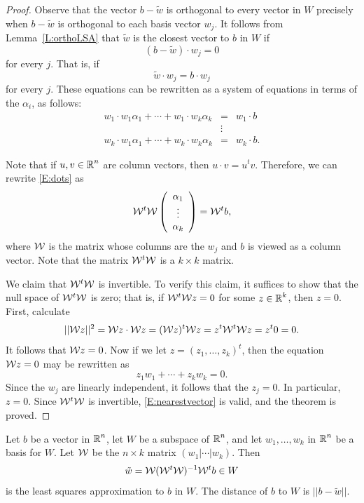 \documentclass{ximera}
\begin{document}
\begin{proof} Observe that the vector $b - \tilde{w}$ is orthogonal to every vector in $W$
precisely when $b-\tilde{w}$ is orthogonal to each basis vector $w_j$.  It
follows from Lemma~\ref{L:orthoLSA} that $\tilde{w}$ is the closest vector to $b$
in $W$ if
\[
(b - \tilde{w})\cdot w_j = 0
\]
for every $j$.  That is, if
\[
\tilde{w} \cdot w_j = b \cdot w_j
\]
for every $j$.  These equations can be rewritten as a system of equations in
terms of the $\alpha_i$, as follows:
\begin{equation}  \label{E:dots}
 \begin{array}{ccc}
w_1\cdot w_1\alpha_1 + \cdots + w_1\cdot w_k\alpha_k & = & w_1\cdot b\\
 & \vdots &  \\
w_k\cdot w_1\alpha_1 + \cdots + w_k\cdot w_k\alpha_k & = & w_k\cdot b.
\end{array}
\end{equation}

Note that if $u,v\in\mbox{$\mathbb{R}$}^n$ are column vectors, then $u\cdot v= u^tv$. Therefore,
we can rewrite \eqref{E:dots} as
\[
\mathcal{W}^t\mathcal{W} \left(\begin{array}{c} \alpha_1\\ \vdots \\ \alpha_k \end{array}\right) =
\mathcal{W}^t b,
\]
where $\mathcal{W}$ is the matrix whose columns are the $w_j$ and $b$ is viewed as a
column vector.  Note that the matrix $\mathcal{W}^t\mathcal{W}$ is a $k\times k$ matrix.

We claim that $\mathcal{W}^t\mathcal{W}$ is invertible.  To verify this claim, it suffices to
show that the null space
of $\mathcal{W}^t\mathcal{W}$ is zero; that is, if $\mathcal{W}^t\mathcal{W} z = 0$ for some
$z\in\mbox{$\mathbb{R}$}^k$, then $z=0$.  First, calculate
\[
||\mathcal{W} z||^2 = \mathcal{W} z\cdot \mathcal{W} z = (\mathcal{W} z)^t\mathcal{W} z = z^t\mathcal{W}^t\mathcal{W} z= z^t0 = 0.
\]
It follows that $\mathcal{W} z=0$.  Now if we let $z=(z_1,\ldots,z_k)^t$, then the
equation $\mathcal{W} z=0$ may be rewritten as
\[
z_1w_1 + \cdots + z_kw_k = 0.
\]
Since the $w_j$ are linearly independent, it follows that the $z_j=0$.  In
particular, $z=0$.  Since $\mathcal{W}^t\mathcal{W} $ is invertible, \eqref{E:nearestvector} is
valid, and the theorem is proved. 
\end{proof}

\begin{corollary} \label{C:nearestvector}
Let $b$ be a vector in $\mbox{$\mathbb{R}$}^n$, let $W$ be a subspace of $\mbox{$\mathbb{R}$}^n$, and
let $w_1,\ldots,w_k$ in $\mbox{$\mathbb{R}$}^n$ be a basis for $W$.
Let $\mathcal{W} $ be the $n\times k$ matrix $(w_1|\cdots| w_k)$.  Then 
\begin{equation} \label{C:w_0_formula}
\tilde{w} =  \mathcal{W} (\mathcal{W}^t\mathcal{W} )^{-1} \mathcal{W}^t b \in W
\end{equation}
 is the least squares approximation to $b$ in $W$.  The distance of 
 $b$ to $W$ is $|| b - \tilde{w} ||$.
\end{corollary}
\end{document}
